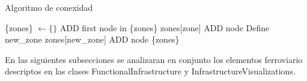     \begin{algorithm}
        \label{alg:connectedness}
        \caption{Algoritmo de conexidad}
        \begin{algorithmic}
            \STATE \{zones\} $\gets \{ \}$
            \STATE ADD first node in \{zones\}
                            \STATE zones[zone] ADD node
                        \ELSE
                            \STATE Define new\_zone
                            \STATE zones[new\_zone] ADD node
                        \ENDIF
                    \ENDIF
                \ENDFOR
            \ENDFOR 
            \OUTPUT \{zones\}   
        \end{algorithmic}
    \end{algorithm}
        
    En las siguientes subsecciones se analizaran en conjunto los elementos ferroviario descriptos en las clases FunctionalInfrastructure y InfrastructureVisualizations.